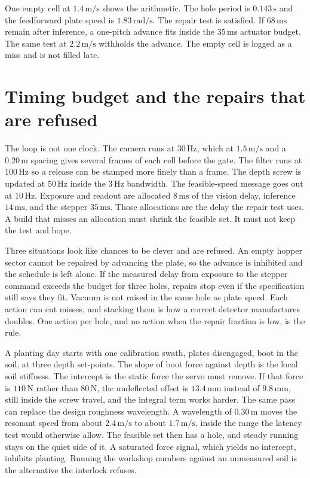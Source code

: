 \documentclass[11pt,a4paper]{article}
\begin{document}
One empty cell at \(1.4\,\mathrm{m/s}\) shows the arithmetic. The hole period is \(0.143\,\mathrm{s}\) and the feedforward plate speed is \(1.83\,\mathrm{rad/s}\). The repair test is satisfied. If \(68\,\mathrm{ms}\) remain after inference, a one-pitch advance fits inside the \(35\,\mathrm{ms}\) actuator budget. The same test at \(2.2\,\mathrm{m/s}\) withholds the advance. The empty cell is logged as a miss and is not filled late.

\section{Timing budget and the repairs that are refused}
The loop is not one clock. The camera runs at \(30\,\mathrm{Hz}\), which at \(1.5\,\mathrm{m/s}\) and a \(0.20\,\mathrm{m}\) spacing gives several frames of each cell before the gate. The filter runs at \(100\,\mathrm{Hz}\) so a release can be stamped more finely than a frame. The depth screw is updated at \(50\,\mathrm{Hz}\) inside the \(3\,\mathrm{Hz}\) bandwidth. The feasible-speed message goes out at \(10\,\mathrm{Hz}\). Exposure and readout are allocated \(8\,\mathrm{ms}\) of the vision delay, inference \(14\,\mathrm{ms}\), and the stepper \(35\,\mathrm{ms}\). Those allocations are the delay the repair test uses. A build that misses an allocation must shrink the feasible set. It must not keep the test and hope.

Three situations look like chances to be clever and are refused. An empty hopper sector cannot be repaired by advancing the plate, so the advance is inhibited and the schedule is left alone. If the measured delay from exposure to the stepper command exceeds the budget for three holes, repairs stop even if the specification still says they fit. Vacuum is not raised in the same hole as plate speed. Each action can cut misses, and stacking them is how a correct detector manufactures doubles. One action per hole, and no action when the repair fraction is low, is the rule.

A planting day starts with one calibration swath, plates disengaged, boot in the soil, at three depth set-points. The slope of boot force against depth is the local soil stiffness. The intercept is the static force the servo must remove. If that force is \(110\,\mathrm{N}\) rather than \(80\,\mathrm{N}\), the undeflected offset is \(13.4\,\mathrm{mm}\) instead of \(9.8\,\mathrm{mm}\), still inside the screw travel, and the integral term works harder. The same pass can replace the design roughness wavelength. A wavelength of \(0.30\,\mathrm{m}\) moves the resonant speed from about \(2.4\,\mathrm{m/s}\) to about \(1.7\,\mathrm{m/s}\), inside the range the latency test would otherwise allow. The feasible set then has a hole, and steady running stays on the quiet side of it. A saturated force signal, which yields no intercept, inhibits planting. Running the workshop numbers against an unmeasured soil is the alternative the interlock refuses.
\end{document}
